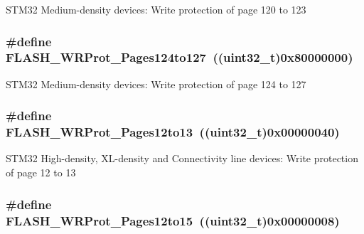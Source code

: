\label{group__Option__Bytes__Write__Protection_gac8d2f42123810fefc68572709d8830ec}
STM32 Medium-\/density devices: Write protection of page 120 to 123 \hypertarget{group__Option__Bytes__Write__Protection_gae6e70db5200b52248c9ec4293ff9890e}{
\subsubsection[{FLASH\_\-WRProt\_\-Pages124to127}]{\setlength{\rightskip}{0pt plus 5cm}\#define FLASH\_\-WRProt\_\-Pages124to127~((uint32\_\-t)0x80000000)}}
\label{group__Option__Bytes__Write__Protection_gae6e70db5200b52248c9ec4293ff9890e}
STM32 Medium-\/density devices: Write protection of page 124 to 127 \hypertarget{group__Option__Bytes__Write__Protection_ga571e248a64ef9bf7f99ed85831aacaaa}{
\subsubsection[{FLASH\_\-WRProt\_\-Pages12to13}]{\setlength{\rightskip}{0pt plus 5cm}\#define FLASH\_\-WRProt\_\-Pages12to13~((uint32\_\-t)0x00000040)}}
\label{group__Option__Bytes__Write__Protection_ga571e248a64ef9bf7f99ed85831aacaaa}
STM32 High-\/density, XL-\/density and Connectivity line devices: Write protection of page 12 to 13 \hypertarget{group__Option__Bytes__Write__Protection_gaa02b9439f75982e2e1c14f8af9a8c091}{
\subsubsection[{FLASH\_\-WRProt\_\-Pages12to15}]{\setlength{\rightskip}{0pt plus 5cm}\#define FLASH\_\-WRProt\_\-Pages12to15~((uint32\_\-t)0x00000008)}}
\label{group__Option__Bytes__Write__Protection_gaa02b9439f75982e2e1c14f8af9a8c091}
